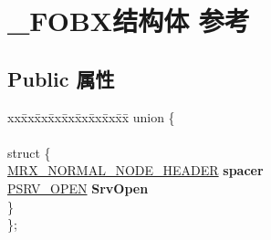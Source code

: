 \hypertarget{struct___f_o_b_x}{}\section{\+\_\+\+F\+O\+B\+X结构体 参考}
\label{struct___f_o_b_x}
\subsection*{Public 属性}
\begin{DoxyCompactItemize}
\item 
\mbox{\label{struct___f_o_b_x_af5c1532831d6e7d61b546de6cfb1926f}} 
\begin{tabbing}
xx\=xx\=xx\=xx\=xx\=xx\=xx\=xx\=xx\=\kill
union \{\\
\\
\mbox{\label{union___f_o_b_x_1_1_0D1594_a3d7475086c3f7fef306c0f67e7df790f}} 
\>struct \{\\
\>\>\hyperlink{struct___m_r_x___n_o_r_m_a_l___n_o_d_e___h_e_a_d_e_r}{MRX\_NORMAL\_NODE\_HEADER} {\bfseries spacer}\\
\>\>\hyperlink{struct___s_r_v___o_p_e_n}{PSRV\_OPEN} {\bfseries SrvOpen}\\
\>\} \\
\}; \\


\end{tabbing}
\end{DoxyCompactItemize}

